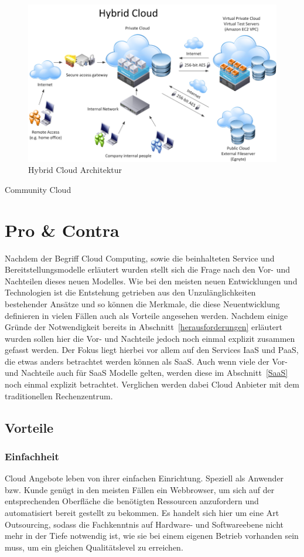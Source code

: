 	\begin{figure}[h]
		\centering
		\includegraphics[width=0.9\linewidth]{images/hybrid-cloud-architektur}
		\caption{Hybrid Cloud Architektur}
		\label{fig:HybridCloud}
	\end{figure}


Community Cloud\\

\section{Pro \& Contra}
Nachdem der Begriff Cloud Computing, sowie die beinhalteten Service und Bereitstellungsmodelle erläutert wurden stellt sich die Frage nach den Vor- und Nachteilen dieses neuen Modelles. Wie bei den meisten neuen Entwicklungen und Technologien ist die Entstehung getrieben aus den Unzulänglichkeiten bestehender Ansätze und so können die Merkmale, die diese Neuentwicklung definieren in vielen Fällen auch als Vorteile angesehen werden. Nachdem einige Gründe der Notwendigkeit bereits in Abschnitt~\ref{herausforderungen} erläutert wurden sollen hier die Vor- und Nachteile jedoch noch einmal explizit zusammen gefasst werden. Der Fokus liegt hierbei vor allem auf den Services IaaS und PaaS, die etwas anders betrachtet werden können als SaaS. Auch wenn viele der Vor- und Nachteile auch für SaaS Modelle gelten, werden diese im Abschnitt~\ref{SaaS} noch einmal explizit betrachtet. Verglichen werden dabei Cloud Anbieter mit dem traditionellen Rechenzentrum.

\subsection{Vorteile}

\subsubsection{Einfachheit}\label{einfachheit}
Cloud Angebote leben von ihrer einfachen Einrichtung. Speziell als Anwender bzw. Kunde genügt in den meisten Fällen ein Webbrowser, um sich auf der entsprechenden Oberfläche die benötigten Ressourcen anzufordern und automatisiert bereit gestellt zu bekommen. Es handelt sich hier um eine Art Outsourcing, sodass die Fachkenntnis auf Hardware- und Softwareebene nicht mehr in der Tiefe notwendig ist, wie sie bei einem eigenen Betrieb vorhanden sein muss, um ein gleichen Qualitätslevel zu erreichen.
